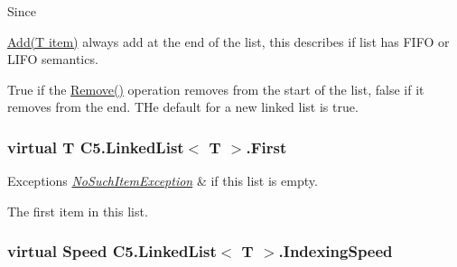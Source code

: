 Since 

{\ttfamily \hyperlink{class_c5_1_1_linked_list_ac205fdb2cfc336ee2c2843c04fcbad41}{Add(\+T item)}} always add at the end of the list, this describes if list has F\+I\+F\+O or L\+I\+F\+O semantics. 

True if the {\ttfamily \hyperlink{class_c5_1_1_linked_list_a91f46345f78948de9227a25acca79cf0}{Remove()}} operation removes from the start of the list, false if it removes from the end. T\+He default for a new linked list is true.\hypertarget{class_c5_1_1_linked_list_a4b3b848cb2d2830e547d667ccf4fe7e2}{}
\subsubsection[{First}]{\setlength{\rightskip}{0pt plus 5cm}virtual T {\bf C5.\+Linked\+List}$<$ T $>$.First\hspace{0.3cm}{\ttfamily [get]}}\label{class_c5_1_1_linked_list_a4b3b848cb2d2830e547d667ccf4fe7e2}





\begin{DoxyExceptions}{Exceptions}
{\em \hyperlink{class_c5_1_1_no_such_item_exception}{No\+Such\+Item\+Exception}} & if this list is empty.\\
\hline
\end{DoxyExceptions}


The first item in this list.\hypertarget{class_c5_1_1_linked_list_ab49ff1340cad026919b2e03a615e25f0}{}
\subsubsection[{Indexing\+Speed}]{\setlength{\rightskip}{0pt plus 5cm}virtual {\bf Speed} {\bf C5.\+Linked\+List}$<$ T $>$.Indexing\+Speed\hspace{0.3cm}{\ttfamily [get]}}\label{class_c5_1_1_linked_list_ab49ff1340cad026919b2e03a615e25f0}




\hypertarget{class_c5_1_1_linked_list_ab20e4a1a12a710451376c6c596123f0a}{}
